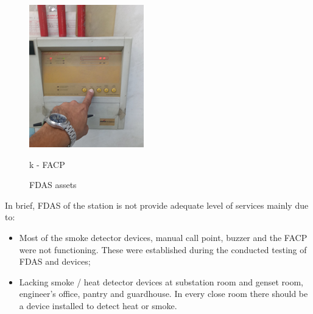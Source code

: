 \begin{figure}[!h]
\begin{minipage}[b]{0.22\linewidth}
		\includegraphics[width=\textwidth]{figures/ch05_fdas_facp}
		\caption*{k - FACP}
	\end{minipage}
	\caption{FDAS assets}
	\label{ch05_fig_fdas01}
\end{figure}

In brief, FDAS of the station is not provide adequate level of services mainly due to:
\begin{itemize}
\item Most of the smoke detector devices, manual call point, buzzer and the FACP were not functioning. These were established  during the conducted testing of FDAS and devices;

\item Lacking smoke / heat detector devices at substation room and genset room, engineer’s office, pantry and guardhouse. In every close room there should be a device installed to detect heat or smoke. 


\end{itemize}

